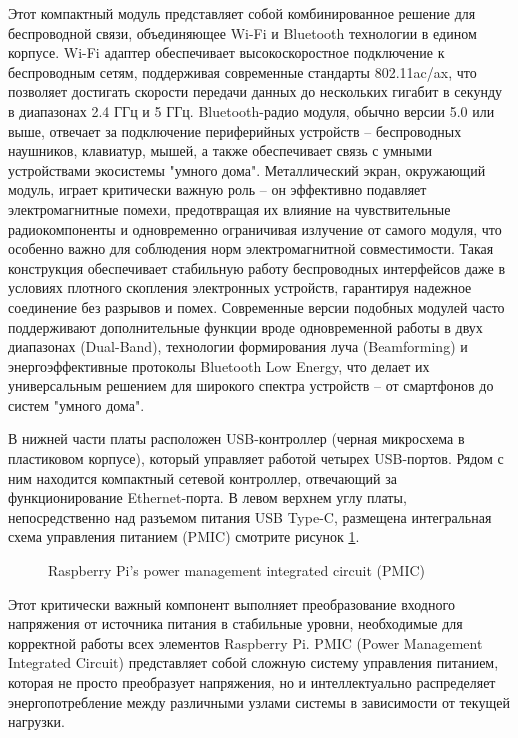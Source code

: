 Этот компактный модуль представляет собой комбинированное решение для беспроводной связи, объединяющее Wi-Fi и Bluetooth технологии в едином корпусе. Wi-Fi адаптер обеспечивает высокоскоростное подключение к беспроводным сетям, поддерживая современные стандарты 802.11ac/ax, что позволяет достигать скорости передачи данных до нескольких гигабит в секунду в диапазонах 2.4 ГГц и 5 ГГц. Bluetooth-радио модуля, обычно версии 5.0 или выше, отвечает за подключение периферийных устройств -- беспроводных наушников, клавиатур, мышей, а также обеспечивает связь с умными устройствами экосистемы "умного дома". Металлический экран, окружающий модуль, играет критически важную роль -- он эффективно подавляет электромагнитные помехи, предотвращая их влияние на чувствительные радиокомпоненты и одновременно ограничивая излучение от самого модуля, что особенно важно для соблюдения норм электромагнитной совместимости. Такая конструкция обеспечивает стабильную работу беспроводных интерфейсов даже в условиях плотного скопления электронных устройств, гарантируя надежное соединение без разрывов и помех. Современные версии подобных модулей часто поддерживают дополнительные функции вроде одновременной работы в двух диапазонах (Dual-Band), технологии формирования луча (Beamforming) и энергоэффективные протоколы Bluetooth Low Energy, что делает их универсальным решением для широкого спектра устройств -- от смартфонов до систем "умного дома".


В нижней части платы расположен USB-контроллер (черная микросхема в пластиковом корпусе), который управляет работой четырех USB-портов. Рядом с ним находится компактный сетевой контроллер, отвечающий за функционирование Ethernet-порта. В левом верхнем углу платы, непосредственно над разъемом питания USB Type-C, размещена интегральная схема управления питанием (PMIC) смотрите рисунок \ref{fig:pmic}.

\begin{figure}[H]
	\centering
	\caption{Raspberry Pi’s power management integrated circuit (PMIC)}
	\label{fig:pmic}
\end{figure}

Этот критически важный компонент выполняет преобразование входного напряжения от источника питания в стабильные уровни, необходимые для корректной работы всех элементов Raspberry Pi. PMIC (Power Management Integrated Circuit) представляет собой сложную систему управления питанием, которая не просто преобразует напряжения, но и интеллектуально распределяет энергопотребление между различными узлами системы в зависимости от текущей нагрузки.

